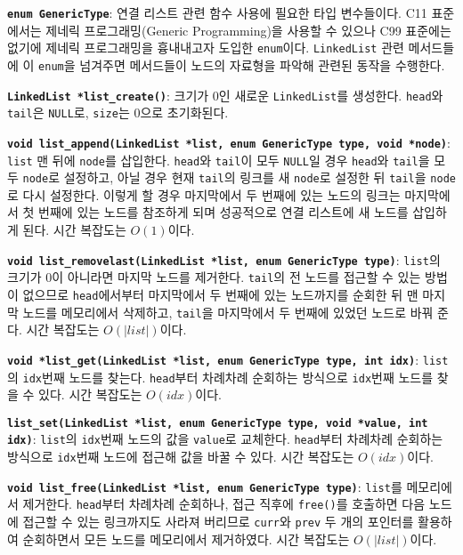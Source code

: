 \documentclass[runningheads]{llncs}
\begin{document}
\textbf{\texttt{enum GenericType}}: 연결 리스트 관련 함수 사용에 필요한 타입 변수들이다. C11 표준에서는 제네릭 프로그래밍(Generic Programming)을 사용할 수 있으나 C99 표준에는 없기에 제네릭 프로그래밍을 흉내내고자 도입한 \texttt{enum}이다. \texttt{LinkedList} 관련 메서드들에 이 \texttt{enum}을 넘겨주면 메서드들이 노드의 자료형을 파악해 관련된 동작을 수행한다.

\textbf{\texttt{LinkedList *list_create()}}: 크기가 0인 새로운 \texttt{LinkedList}를 생성한다. \texttt{head}와 \texttt{tail}은 \texttt{NULL}로, \texttt{size}는 0으로 초기화된다.

\textbf{\texttt{void list_append(LinkedList *list, enum GenericType type, void *node)}}: \texttt{list} 맨 뒤에 \texttt{node}를 삽입한다. \texttt{head}와 \texttt{tail}이 모두 \texttt{NULL}일 경우 \texttt{head}와 \texttt{tail}을 모두 \texttt{node}로 설정하고, 아닐 경우 현재 \texttt{tail}의 링크를 새 \texttt{node}로 설정한 뒤 \texttt{tail}을 \texttt{node}로 다시 설정한다. 이렇게 할 경우 마지막에서 두 번째에 있는 노드의 링크는 마지막에서 첫 번째에 있는 노드를 참조하게 되며 성공적으로 연결 리스트에 새 노드를 삽입하게 된다. 시간 복잡도는 $O(1)$이다.

\textbf{\texttt{void list_removelast(LinkedList *list, enum GenericType type)}}: \texttt{list}의 크기가 0이 아니라면 마지막 노드를 제거한다. \texttt{tail}의 전 노드를 접근할 수 있는 방법이 없으므로 \texttt{head}에서부터 마지막에서 두 번째에 있는 노드까지를 순회한 뒤 맨 마지막 노드를 메모리에서 삭제하고, \texttt{tail}을 마지막에서 두 번째에 있었던 노드로 바꿔 준다. 시간 복잡도는 $O(\left|list\right|)$이다.

\textbf{\texttt{void *list_get(LinkedList *list, enum GenericType type, int idx)}}: \texttt{list}의 \texttt{idx}번째 노드를 찾는다. \texttt{head}부터 차례차례 순회하는 방식으로 \texttt{idx}번째 노드를 찾을 수 있다. 시간 복잡도는 $O(idx)$이다.

\textbf{\texttt{list_set(LinkedList *list, enum GenericType type, void *value, int idx)}}: \texttt{list}의 \texttt{idx}번째 노드의 값을 \texttt{value}로 교체한다. \texttt{head}부터 차례차례 순회하는 방식으로 \texttt{idx}번째 노드에 접근해 값을 바꿀 수 있다. 시간 복잡도는 $O(idx)$이다.

\textbf{\texttt{void list_free(LinkedList *list, enum GenericType type)}}: \texttt{list}를 메모리에서 제거한다. \texttt{head}부터 차례차례 순회하나, 접근 직후에 \texttt{free()}를 호출하면 다음 노드에 접근할 수 있는 링크까지도 사라져 버리므로 \texttt{curr}와 \texttt{prev} 두 개의 포인터를 활용하여 순회하면서 모든 노드를 메모리에서 제거하였다. 시간 복잡도는 $O(\left|list\right|)$이다.
\end{document}
